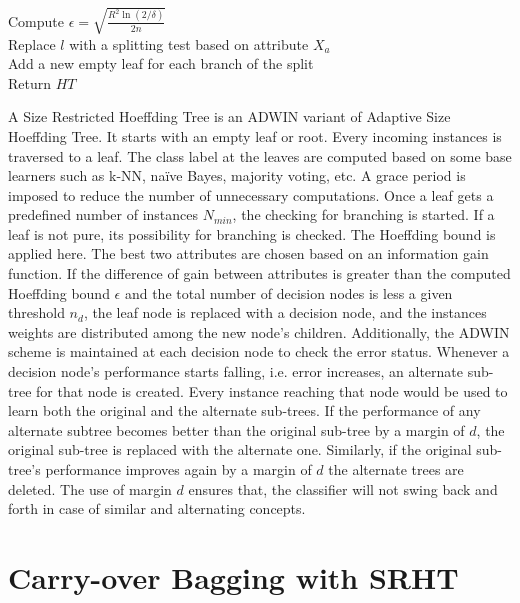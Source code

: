 \begin{algorithm}[htbp]
{{{{                    Compute $\epsilon = \sqrt{\frac{R^2 \ln(2/\delta)}{2n}}$   \\
                    
                     {
                         {
                            Replace $l$ with a splitting test based on attribute $X_a$ \\
                            Add a new empty leaf for each branch of the split \\
                        }
                    }
                }
            }
        }
    Return $HT$
    }
\end{algorithm}

A Size Restricted Hoeffding Tree is an ADWIN variant of Adaptive Size Hoeffding Tree. It starts with an empty leaf or root. Every incoming instances is traversed to a leaf. The class label at the leaves are computed based on some base learners such as k-NN, na\"ive Bayes, majority voting, etc. A grace period is imposed to reduce the number of unnecessary computations. Once a leaf gets a predefined number of instances $N_{min}$, the checking for branching is started. If a leaf is not pure, its possibility for branching is checked. The Hoeffding bound is applied here. The best two attributes  are chosen based on an information gain function. If the difference of gain between attributes is greater than the computed Hoeffding bound $\epsilon$ and the total number of decision nodes is less a given threshold $n_d$, the leaf node is replaced with a decision node, and the instances weights are distributed among the new node's children. Additionally, the ADWIN scheme is maintained at each decision node to check the error status. Whenever a decision node's performance starts falling, i.e. error increases, an alternate sub-tree for that node is created. Every instance reaching that node would be used to learn both the original and the alternate sub-trees. If the performance of any alternate subtree becomes better than the original sub-tree by a margin of $d$, the original sub-tree is replaced with the alternate one. Similarly, if the original sub-tree's performance improves again by a margin of $d$ the alternate trees are deleted. The use of margin $d$ ensures that, the classifier will not swing back and forth in case of similar and alternating concepts.

\section{Carry-over Bagging with SRHT}

